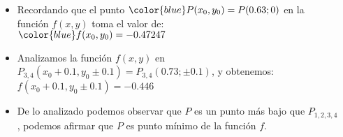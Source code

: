 \begin{columns}
\begin{column}{0.47\textwidth}
\begin{tikzpicture}[samples=50]
        \end{tikzpicture} 
    \end{column}
    \begin{column}{0.47\textwidth}
        \begin{itemize}
            \item Recordando que el punto $\color{blue}P(x_{0},y_{0})=P(0.63;0)$ en la función $f(x,y)$ toma el valor de:
                    \\
                    $\color{blue}f(x_{0},y_{0})=-0.47247$
            \item Analizamos la función $f(x,y)$ en $P_{3,4}(x_{0}+0.1,y_{0} \pm 0.1)=P_{3,4}(0.73; \pm 0.1)$, y obtenemos:
                    \\
                    $f(x_{0}+0.1,y_{0} \pm 0.1)=-0.446$
            \item De lo analizado podemos observar que $P$ es un punto más bajo que $P_{1,2,3,4}$, podemos afirmar que $P$ es punto mínimo de la función $f$.
        \end{itemize}
    \end{column}
\end{columns}


    

